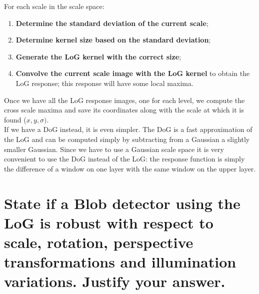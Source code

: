 \documentclass{article}
\begin{document}
For each scale in the scale space:
\begin{enumerate}
    \item \textbf{Determine the standard deviation of the current scale};
    \item \textbf{Determine kernel size based on the standard deviation};
    \item \textbf{Generate the LoG kernel with the correct size};
    \item \textbf{Convolve the current scale image with the LoG kernel} to obtain the LoG response; this response will have some local maxima.
\end{enumerate}

Once we have all the LoG response images, one for each level, we compute the cross scale maxima and save its coordinates along with the scale at which it is found ($x, y, \sigma)$.\\

If we have a DoG instead, it is even simpler. The DoG is a fast approximation of the LoG and can be computed simply by subtracting from a Gaussian a slightly smaller Gaussian. Since we have to use a Gaussian scale space it is very convenient to use the DoG instead of the LoG: the response function is simply the difference of a window on one layer with the same window on the upper layer. 

\newpage

\section{State if a Blob detector using the LoG is robust with respect to scale, rotation, perspective transformations and illumination variations. Justify your answer.}
\end{document}
